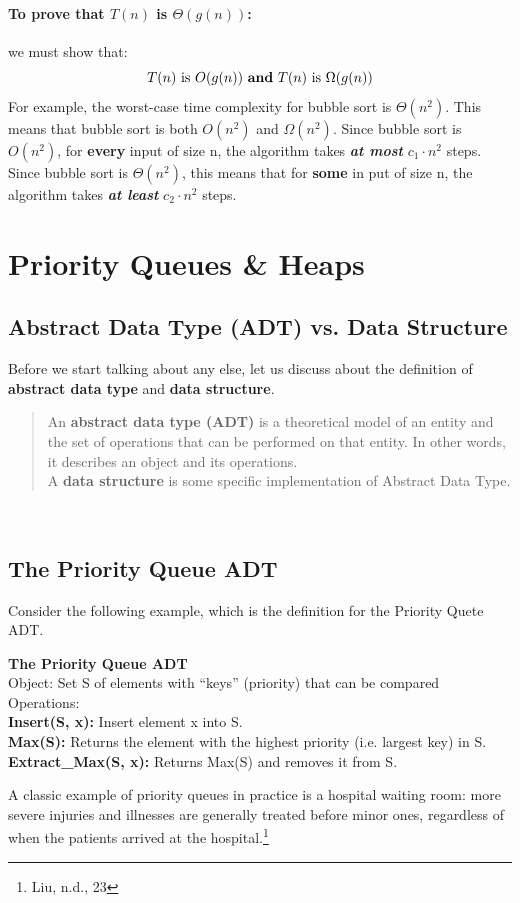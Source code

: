 \documentclass{article}
\begin{document}
\paragraph{To prove that $T(n)$ is $\Theta(g(n))$:} we must show that:
$$\text{$T(n)$ is $O(g(n))$ \textbf{and} $T(n)$ is $\Omega{(g(n))}$}$$
For example, the worst-case time complexity for bubble sort is $\Theta(n^2)$. This means that bubble sort is both $O(n^2)$ and $\Omega(n^2)$. Since bubble sort is $O(n^2)$, for \textbf{every} input of size n, the algorithm takes\textit{ \textbf{at most}} $c_1 \cdot n^2$ steps. Since bubble sort is $\Theta(n^2)$, this means that for \textbf{some} in put of size n, the algorithm takes \textbf{\textit{at least}} $c_2 \cdot n^2$ steps.
\section{Priority Queues \& Heaps}
\subsection{Abstract Data Type (ADT) vs. Data Structure}
Before we start talking about any else, let us discuss about the definition of \textbf{abstract data type} and \textbf{data structure}.\begin{quotation} \noindent An \textbf{abstract data type (ADT)} is a theoretical model of an entity and the set of operations that can be performed on that entity. In other words, it {describes an object and its operations.}\\ \noindent A \textbf{data structure} is {some specific implementation of Abstract Data Type.}\end{quotation}\\
\subsection{The Priority Queue ADT}
Consider the following example, which is the definition for the Priority Quete ADT.
\begin{framed}
\textbf{The Priority Queue ADT}\\
\indent Object: Set S of elements with ``keys'' (priority) that can be compared
\\
\indent Operations: \\
\indent \indent \textbullet \indent \textbf{Insert(S, x): }Insert element x into S.
\\
\indent \indent \textbullet \indent \textbf{Max(S): } Returns the element with the highest priority (i.e. largest key) in S.
\\
\indent \indent \textbullet \indent \textbf{Extract\_Max(S, x): } Returns Max(S) and removes it from S.
\end{framed}
A classic example of priority queues in practice is a hospital waiting
room: more severe injuries and illnesses are generally treated before minor
ones, regardless of when the patients arrived at the hospital.\footnote{Liu, n.d., 23}
\end{document}
